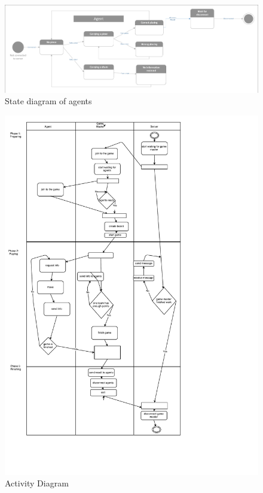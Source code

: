 \documentclass[11pt,a4paper]{article}
\begin{document}
\begin{figure}

\begin{center}
\includegraphics[scale=0.6]{Agent-state}
\caption{State diagram of agents}
\label{fig:AgentStateDiagram}
\end{center}


\end{figure}

\begin{figure}
\vspace*{-1.5in}
\includegraphics[scale=0.56]{active_diagram_5}
\caption{Activity Diagram}
\label{fig:ActiveDiagram}

\end{figure}
\end{document}

